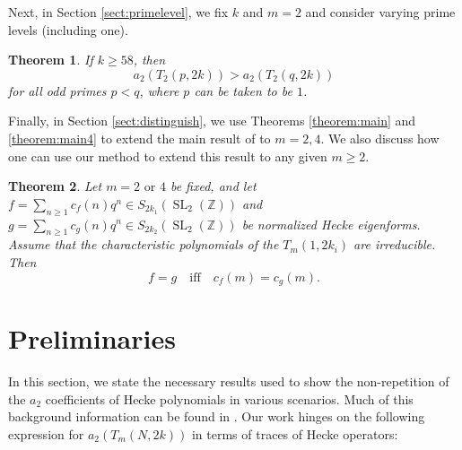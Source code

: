 \documentclass[11pt,letterpaper,reqno]{amsart}
\numberwithin{figure}{section}
\numberwithin{table}{section}
\theoremstyle{definition}
\theoremstyle{plain}
\newcommand{\ZZ}{\mathbb{Z}}
\newtheorem{theorem}{Theorem}[section]
\theoremstyle{definition}
\theoremstyle{definition}
\theoremstyle{remark}
\numberwithin{equation}{section}
\DeclareMathOperator{\SL}{SL}
\begin{document}
Next, in Section \ref{sect:primelevel}, we 
fix $k$ and $m=2$ and consider varying prime levels (including one).
\begin{theorem} \label{theorem:primelevel}
 If $k\ge 58$, then
    \begin{equation}
      a_{2}(T_2(p,2k))> a_{2}(T_2(q,2k))
    \end{equation}
 for all odd primes $p< q$, where $p$ can be taken to be $1$.
\end{theorem}


Finally, in Section \ref{sect:distinguish}, we use Theorems \ref{theorem:main} and \ref{theorem:main4} to extend the main result of \cite{Vilardi2018} to $m=2,4$.
We also discuss how one can use our method to extend this result to any given $m \ge 2$.
\begin{theorem} \label{theorem:distinguish-eigenforms}
    Let $m = 2 \text{ or }4$ be fixed, and let $f=\sum_{n\ge1} c_f(n) q^n\in S_{2k_1}(\SL_2(\ZZ))$ and $g=\sum_{n\ge1} c_g(n) q^n\in S_{2k_2}(\SL_2(\ZZ))$ be normalized Hecke eigenforms. Assume that the characteristic polynomials of the $T_m(1,2k_i)$ are irreducible. Then
    \begin{equation}
    f=g \quad \text{iff} \quad c_f(m) = c_g(m).
    \end{equation}
\end{theorem}









\section{Preliminaries}

In this section, we state the necessary results used to show the non-repetition of the $a_2$ coefficients of Hecke polynomials in various scenarios. Much of this background information can be found in \cite{previousPaper}.  Our work hinges on the following expression for $a_2(T_m(N, 2k))$ in terms of traces of Hecke operators:
\end{document}
